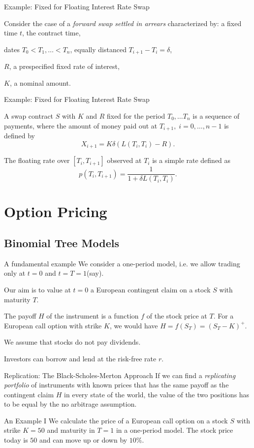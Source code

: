 Example: Fixed for Floating Interest Rate Swap

Consider the case of a {\it forward swap settled in arrears} characterized by:
	a fixed time $t$, the  contract time, 
	
	dates $T_0 < T_1, \ldots < T_n$, equally distanced $T_{i+1}-T_i = \delta$,
	
	$R$,  a prespecified fixed rate of interest,
	
	$K$,  a nominal amount.



Example: Fixed for Floating Interest Rate Swap

A swap contract $S$ with $K$ and $R$ fixed for the period $T_0,
\ldots T_n$ is a sequence of payments, where the amount of money
paid out at $T_{i+1}, \; i=0, \ldots, n-1$ is defined by
$$
X_{i+1} = K \delta (L(T_i,T_i)-R).
$$

The floating rate over $[T_i, T_{i+1}]$ observed at $T_i$ is a
simple rate defined as
$$
p(T_i, T_{i+1}) = \frac{1}{1 + \delta L(T_i,T_i)}.
$$



\section{Option Pricing}
\subsection{Binomial Tree Models}
 
A fundamental example
	We consider a one-period model, i.e. we allow trading only at
	$t=0$ and $t=T=1$(say).
		
		Our aim is to value at $t=0$  a European contingent claim on a stock $S$
		with maturity $T$.
		
		The payoff $H$ of the instrument is a function $f$ of the stock price at
		$T$. For a European call option with strike $K$, we would have
		$H=f(S_T)=(S_T-K)^+$.
		
		We assume that stocks do not pay dividends.
		
		Investors can borrow and lend at the risk-free rate $r$.


Replication: The Black-Scholes-Merton Approach
If we can find a \emph{replicating portfolio} of instruments with known prices
that has the same payoff as the contingent claim $H$ in every state of the world, the value of the
two positions has to be equal by the no arbitrage assumption.


An Example I
We calculate the price of a European call option on a stock $S$ with strike
$K=50$ and maturity in $T=1$ in a one-period model. The stock price today is
$50$ and can move up or down by $10\%$.

